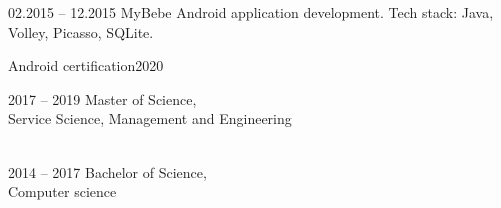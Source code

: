 \documentclass[12pt, a4paper]{article}
\newcommand{\midSectionSpace}{16pt}
\begin{document}
\begin{minipage}[t]{0.6\textwidth}
    \vspace{\midSectionSpace}
    
    \begin{subsec}{}{02.2015 – 12.2015}
        \> MyBebe Android application development. \lineend
        \> Tech stack: Java, Volley, Picasso, SQLite. \\
    \end{subsec}
    
    \vspace{24pt}
    
    
    \vspace{24pt}
    
    \begin{subsec}{Android certification}{2020}
        \>  \\
    \end{subsec}
    
    \vspace{\midSectionSpace}
    
    \begin{subsec}{}{2017 – 2019}
        \> Master of Science,  \\
        \> Service Science, Management and Engineering \\
        \>  \\
    \end{subsec}
    
    \vspace{\midSectionSpace}
    
    \begin{subsec}{}{2014 – 2017}
        \> Bachelor of Science,  \\
        \> Computer science \\
    \end{subsec}
\end{minipage}
\end{document}
